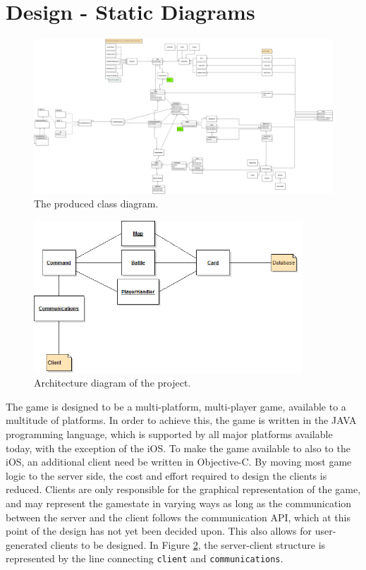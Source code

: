 
\section{Design - Static Diagrams}
\label{sec:staticdiagrams}

\begin{figure}[]
\center
\includegraphics[width=1.65\textwidth,angle=90] {diagrams/ClassDiagram.png}
\caption{The produced class diagram.}
\label{classdiagram}
\end{figure}


\begin{figure}[]
\center
\includegraphics[width=0.9\textwidth] {diagrams/ArchitectureDiagram.png}
\caption{Architecture diagram of the project.}
\label{architecture}
\end{figure}


The game is designed to be a multi-platform, multi-player game, available to a multitude of platforms. In order to achieve this, the game is written in the JAVA programming language, which is supported by all major platforms available today, with the exception of the iOS. To make the game available to also to the iOS, an additional client need be written in Objective-C. By moving most game logic to the server side, the cost and effort required to design the clients is reduced. Clients are only responsible for the graphical representation of the game, and may represent the gamestate in varying ways as long as the communication between the server and the client follows the communication API, which at this point of the design has not yet been decided upon. This also allows for user-generated clients to be designed. In Figure \ref{architecture}, the server-client structure is represented by the line connecting \texttt{client} and \texttt{communications}.

